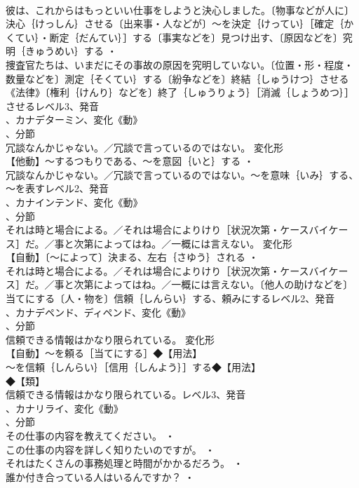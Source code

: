 \documentclass[8pt]{extreport}
\begin{document}
\begin{CJK}{UTF8}{min}
\\	彼は、これからはもっといい仕事をしようと決心しました。〔物事などが人に〕決心｛けっしん｝させる〔出来事・人などが〕～を決定｛けってい｝［確定｛かくてい｝・断定｛だんてい｝］する〔事実などを〕見つけ出す、〔原因などを〕究明｛きゅうめい｝する ・
\\	捜査官たちは、いまだにその事故の原因を究明していない。〔位置・形・程度・数量などを〕測定｛そくてい｝する〔紛争などを〕終結｛しゅうけつ｝させる《法律》〔権利｛けんり｝などを〕終了｛しゅうりょう｝［消滅｛しょうめつ｝］させるレベル3、発音
\\	、カナデターミン、変化《動》
\\	、分節
\\	冗談なんかじゃない。／冗談で言っているのではない。	変化形 
\\	【他動】～するつもりである、～を意図｛いと｝する ・
\\	冗談なんかじゃない。／冗談で言っているのではない。～を意味｛いみ｝する、～を表すレベル2、発音
\\	、カナインテンド、変化《動》
\\	、分節
\\	それは時と場合による。／それは場合によりけり［状況次第・ケースバイケース］だ。／事と次第によってはね。／一概には言えない。	変化形 
\\	【自動】〔～によって〕決まる、左右｛さゆう｝される ・
\\	それは時と場合による。／それは場合によりけり［状況次第・ケースバイケース］だ。／事と次第によってはね。／一概には言えない。〔他人の助けなどを〕当てにする〔人・物を〕信頼｛しんらい｝する、頼みにするレベル2、発音
\\	、カナデペンド、ディペンド、変化《動》
\\	、分節
\\	信頼できる情報はかなり限られている。	変化形 
\\	【自動】～を頼る［当てにする］◆【用法】
\\	～を信頼｛しんらい｝［信用｛しんよう｝］する◆【用法】
\\	◆【類】
\\	信頼できる情報はかなり限られている。レベル3、発音
\\	、カナリライ、変化《動》
\\	、分節
\\	その仕事の内容を教えてください。 ・
\\	この仕事の内容を詳しく知りたいのですが。 ・
\\	それはたくさんの事務処理と時間がかかるだろう。 ・
\\	誰か付き合っている人はいるんですか？ ・

\end{CJK}
\end{document}
